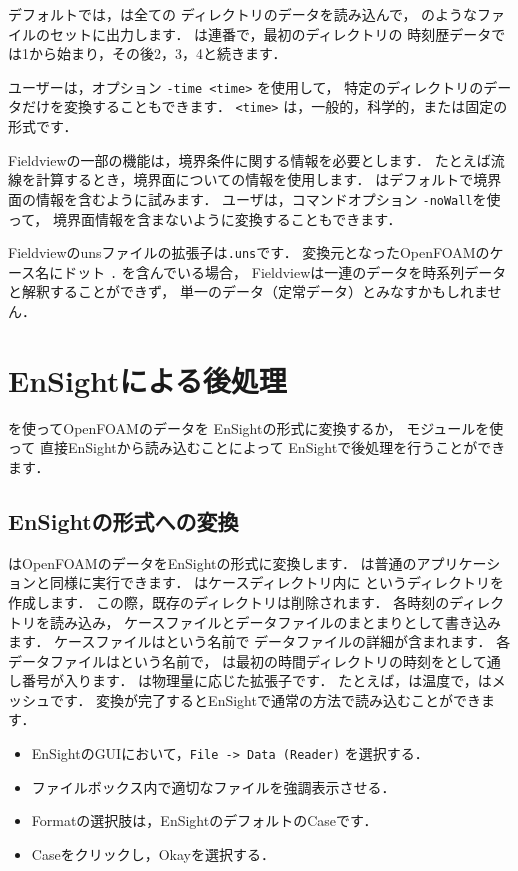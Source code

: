 デフォルトでは，は全ての
ディレクトリのデータを読み込んで，\break
{}のようなファイルのセットに出力します．
は連番で，最初のディレクトリの
時刻歴データでは1から始まり，その後2，3，4と続きます．

ユーザーは，オプション \verb|-time <time>| を使用して，
特定のディレクトリのデータだけを変換することもできます．
\verb|<time>| は，一般的，科学的，または固定の形式です．

Fieldviewの一部の機能は，境界条件に関する情報を必要とします．
たとえば流線を計算するとき，境界面についての情報を使用します．
はデフォルトで境界面の情報を含むように試みます．
ユーザは，コマンドオプション \verb|-noWall|を使って，
境界面情報を含まないように変換することもできます．

Fieldviewのunsファイルの拡張子は\texttt{.uns}です．
変換元となったOpenFOAMのケース名にドット \texttt{.} を含んでいる場合，
Fieldviewは一連のデータを時系列データと解釈することができず，
単一のデータ（定常データ）とみなすかもしれません．



\section{EnSightによる後処理}
\label{sec:6.4}
を使ってOpenFOAMのデータを
EnSightの形式に変換するか，\break
{}モジュールを使って
直接EnSightから読み込むことによって
EnSightで後処理を行うことができます．


\subsection{EnSightの形式への変換}
\label{ssec:6.4.1}
はOpenFOAMのデータをEnSightの形式に変換します．
は普通のアプリケーションと同様に実行できます．
はケースディレクトリ内に
というディレクトリを作成します．
この際，既存のディレクトリは削除されます．
各時刻のディレクトリを読み込み，
ケースファイルとデータファイルのまとまりとして書き込みます．
ケースファイルはという名前で
データファイルの詳細が含まれます．
各データファイルはという名前で，
は最初の時間ディレクトリの時刻をとして通し番号が入ります．
は物理量に応じた拡張子です．
たとえば，は温度で，はメッシュです．
変換が完了するとEnSightで通常の方法で読み込むことができます．
\begin{itemize}
 \item EnSightのGUIにおいて，\texttt{File -> Data (Reader)} を選択する．
 \item ファイルボックス内で適切なファイルを強調表示させる．
 \item Formatの選択肢は，EnSightのデフォルトのCaseです．
 \item Caseをクリックし，Okayを選択する．
\end{itemize}


